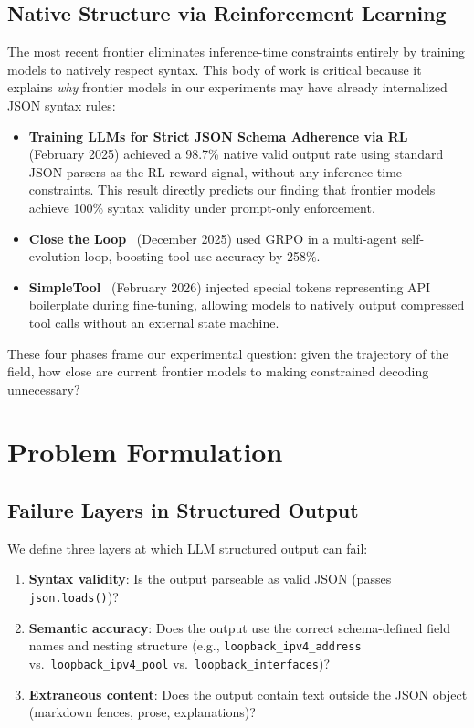 \documentclass[11pt, letterpaper]{article}
\begin{document}
\subsection{Native Structure via Reinforcement Learning}
\label{sec:rl_native}

The most recent frontier eliminates inference-time constraints entirely by training models to natively respect syntax. This body of work is critical because it explains \emph{why} frontier models in our experiments may have already internalized JSON syntax rules:

\begin{itemize}[leftmargin=*]
    \item \textbf{Training LLMs for Strict JSON Schema Adherence via RL}~\cite{rl_json} (February 2025) achieved a 98.7\% native valid output rate using standard JSON parsers as the RL reward signal, without any inference-time constraints. This result directly predicts our finding that frontier models achieve 100\% syntax validity under prompt-only enforcement.
    \item \textbf{Close the Loop}~\cite{close_loop} (December 2025) used GRPO in a multi-agent self-evolution loop, boosting tool-use accuracy by 258\%.
    \item \textbf{SimpleTool}~\cite{simpletool} (February 2026) injected special tokens representing API boilerplate during fine-tuning, allowing models to natively output compressed tool calls without an external state machine.
\end{itemize}

These four phases frame our experimental question: given the trajectory of the field, how close are current frontier models to making constrained decoding unnecessary?

\section{Problem Formulation}
\label{sec:problem}

\subsection{Failure Layers in Structured Output}
\label{sec:failure_layers}

We define three layers at which LLM structured output can fail:

\begin{enumerate}
    \item \textbf{Syntax validity}: Is the output parseable as valid JSON (passes \texttt{json.loads()})?
    \item \textbf{Semantic accuracy}: Does the output use the correct schema-defined field names and nesting structure (e.g., \texttt{loopback\_ipv4\_address} vs.\ \texttt{loopback\_ipv4\_pool} vs.\ \texttt{loopback\_interfaces})?
    \item \textbf{Extraneous content}: Does the output contain text outside the JSON object (markdown fences, prose, explanations)?
\end{enumerate}
\end{document}
